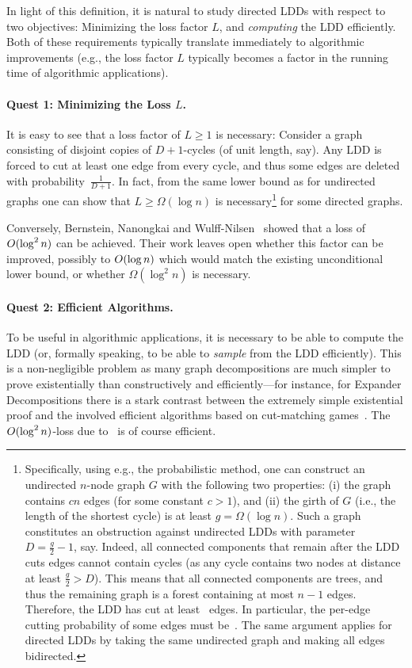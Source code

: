 \documentclass[letterpaper,11pt]{article}
\begin{document}
In light of this definition, it is natural to study directed LDDs with respect to two objectives: Minimizing the loss factor $L$, and \emph{computing} the LDD efficiently. Both of these requirements typically translate immediately to algorithmic improvements (e.g., the loss factor $L$ typically becomes a factor in the running time of algorithmic applications).

\paragraph{Quest 1: Minimizing the Loss \boldmath$L$.}
It is easy to see that a loss factor of $L \geq 1$ is necessary: Consider a graph consisting of disjoint copies of $D + 1$-cycles (of unit length, say). Any LDD is forced to cut at least one edge from every cycle, and thus some edges are deleted with probability~$\frac{1}{D+1}$. In fact, from the same lower bound as for undirected graphs one can show that $L \geq \Omega(\log n)$ is necessary\footnote{Specifically, using e.g., the probabilistic method, one can construct an undirected $n$-node graph $G$ with the following two properties: (i) the graph contains $c n$ edges (for some constant $c > 1$), and (ii) the girth of $G$ (i.e., the length of the shortest cycle) is at least $g = \Omega(\log n)$. Such a graph constitutes an obstruction against undirected LDDs with parameter $D = \frac{g}{2} - 1$, say. Indeed, all connected components that remain after the LDD cuts edges cannot contain cycles (as any cycle contains two nodes at distance at least $\frac{g}{2} > D$). This means that all connected components are trees, and thus the remaining graph is a forest containing at most $n - 1$ edges. Therefore, the LDD has cut at least~ edges. In particular, the per-edge cutting probability of some edges must be~. The same argument applies for directed LDDs by taking the same undirected graph and making all edges bidirected.\label{foot:logn-lower-bound}} for some directed graphs.

Conversely, Bernstein, Nanongkai and Wulff-Nilsen~\cite{BernsteinNW22} showed that a loss of $O(\log^2 n)$ can be achieved. Their work leaves open whether this factor can be improved, possibly to $O(\log n)$ which would match the existing unconditional lower bound, or whether $\Omega(\log^2 n)$ is necessary.


\paragraph{Quest 2: Efficient Algorithms.}
To be useful in algorithmic applications, it is necessary to be able to compute the LDD (or, formally speaking, to be able to \emph{sample} from the LDD efficiently). This is a non-negligible problem as many graph decompositions are much simpler to prove existentially than constructively and efficiently---for instance, for Expander Decompositions there is a stark contrast between the extremely simple existential proof and the involved efficient algorithms based on cut-matching games~\cite{RackeST14,KhandekarRaoVazirani09}. The $O(\log^2 n)$-loss due to~\cite{BernsteinNW22} is of course efficient.
\end{document}
